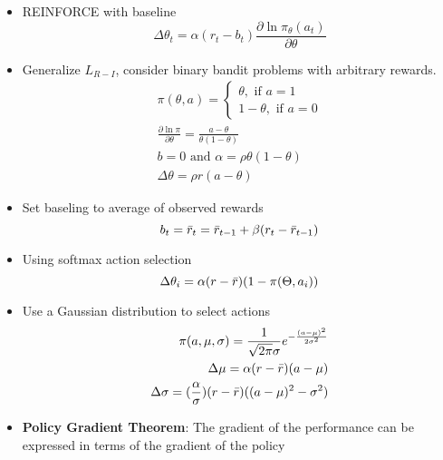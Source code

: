 \documentclass[a4paper]{article}
\begin{document}
\begin{itemize}
\begin{equation*}
    \end{equation*}
    \item REINFORCE with baseline
    \begin{equation*}
        \Delta \theta_t=\alpha (r_t-b_t)\frac{\partial \ln{\pi_\theta(a_t)}}{\partial \theta}
    \end{equation*}
    \item Generalize $L_{R-I}$, consider binary bandit problems with arbitrary rewards.
    \begin{equation*}
        \begin{split}
            \pi(\theta,a)=\begin{cases}
                \theta,\text{ if }a=1\\
                1-\theta,\text{ if }a=0
            \end{cases}\\
            \frac{\partial \ln{\pi}}{\partial \theta}=\frac{a-\theta}{\theta(1-\theta)}\\
            b=0\text{ and }\alpha=\rho \theta(1-\theta)\\
            \Delta \theta=\rho r (a-\theta)
        \end{split}
    \end{equation*}
    \item Set baseling to average of observed rewards
    \begin{equation*}
        b_t=\Bar{r}_t=\Bar{r}_{t-1}+\beta(r_t-\Bar{r}_{t-1})
    \end{equation*}
    \item Using softmax action selection
    \begin{equation*}
        \Delta \theta_i=\alpha(r-\Bar{r})(1-\pi(\Theta,a_i))
    \end{equation*}
    \item Use a Gaussian distribution to select actions
    \begin{equation*}
        \begin{split}
            \pi(a,\mu,\sigma)=\frac{1}{\sqrt{2\pi}\sigma}e^{-\frac{(a-\mu)^2}{2\sigma^2}}\\
            \Delta \mu=\alpha(r-\Bar{r})(a-\mu)\\
            \Delta \sigma=(\frac{\alpha}{\sigma})(r-\Bar{r})((a-\mu)^2-\sigma^2)
        \end{split}
    \end{equation*}
    \item \textbf{Policy Gradient Theorem}: The gradient of the performance can be expressed in terms of the gradient of the policy

\end{itemize}
\end{document}
